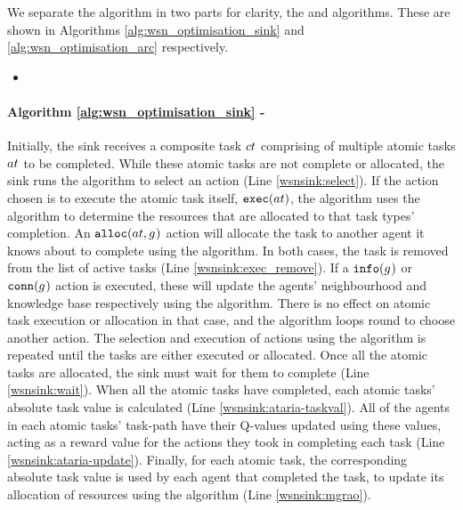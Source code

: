 We separate  the \acronymWSNOptimisation{}{} algorithm in two parts for clarity, the \acronymWSNOptimisationSink{}{} and \acronymWSNOptimisationArc{}{} algorithms. These are shown in Algorithms \ref{alg:wsn_optimisation_sink} and \ref{alg:wsn_optimisation_arc} respectively. 

\begin{itemize}
	\item 
\end{itemize}
\paragraph{Algorithm \ref{alg:wsn_optimisation_sink} - \acronymWSNOptimisationSink{}{}}
Initially, the sink receives a composite task $\varCompositeTask{}{}$ comprising of multiple atomic tasks $\varAtomicTask{}{}$ to be completed. While these atomic tasks are not complete or allocated, the sink runs the \acronymATARIA{}{} algorithm to select an action (Line \ref{wsnsink:select}).  If the action chosen is to execute the atomic task itself, $\functionExec{}{}$, the algorithm uses the \acronymMGRAO{}{} algorithm to determine the resources that are allocated to that task types' completion. An $\functionAlloc{}{}$ action will allocate the task to another agent it knows about to complete using the \acronymWSNOptimisationArc{}{} algorithm. In both cases, the task is removed from the list of active tasks  (Line \ref{wsnsink:exec_remove}). If a $\functionInfo{}{}$ or $\functionLink{}{}$ action is executed, these will update the agents' neighbourhood and knowledge base respectively using the \acronymATARIA{}{} algorithm. There is no effect on atomic task execution or allocation in that case, and the algorithm loops round to choose another action. The selection and execution of actions using the \acronymATARIA{}{} algorithm is repeated until the tasks are either executed or allocated. Once all the atomic tasks are allocated, the sink must wait for them to complete (Line \ref{wsnsink:wait}). When all the atomic tasks have completed, each atomic tasks' absolute task value is calculated (Line \ref{wsnsink:ataria-taskval}). All of the agents in each atomic tasks' task-path have their Q-values updated using these values, acting as a reward value for the actions they took in completing each task (Line \ref{wsnsink:ataria-update}). Finally, for each atomic task, the corresponding absolute task value is used by each agent that completed the task, to update its allocation of resources using the \acronymMGRAO{}{} algorithm (Line \ref{wsnsink:mgrao}).
